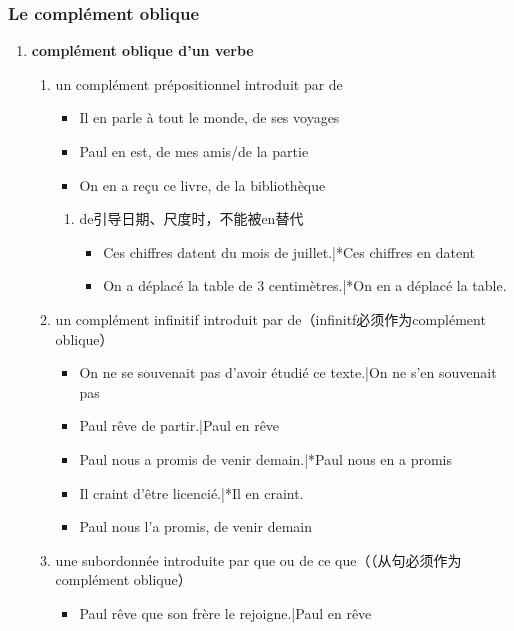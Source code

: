 \documentclass[UTF8]{report}
\begin{document}
\subsubsection{Le complément oblique}
\begin{enumerate}
    \item \textbf{complément oblique d’un verbe}
    \begin{enumerate}
        \item un complément prépositionnel introduit par de
        \begin{itemize}
            \item Il en parle à tout le monde, de ses voyages
            \item Paul en est, de mes amis/de la partie
            \item On en a reçu ce livre, de la bibliothèque
        \end{itemize}
        \begin{enumerate}
            \item de引导日期、尺度时，不能被en替代
            \begin{itemize}
                \item Ces chiffres datent du mois de juillet.|*Ces chiffres en datent
                \item On a déplacé la table de 3 centimètres.|*On en a déplacé la table.
            \end{itemize}
        \end{enumerate}
        \item un complément infinitif introduit par de（infinitf必须作为complément oblique）
        \begin{itemize}
            \item On ne se souvenait pas d’avoir étudié ce texte.|On ne s’en souvenait pas
            \item Paul rêve de partir.|Paul en rêve
            \item Paul nous a promis de venir demain.|*Paul nous en a promis
            \item Il craint d’être licencié.|*Il en craint.
            \item Paul nous l’a promis, de venir demain
        \end{itemize}
        \item une subordonnée introduite par que ou de ce que（（从句必须作为complément oblique）
        \begin{itemize}
            \item Paul rêve que son frère le rejoigne.|Paul en rêve

\end{itemize}
\end{enumerate}
\end{enumerate}
\end{document}
